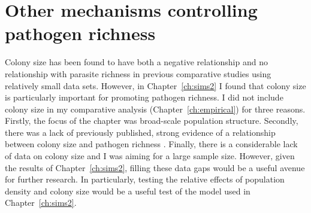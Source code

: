 \section{Other mechanisms controlling pathogen richness}

Colony size has been found to have both a negative relationship \cite{gay2014parasite} and no relationship \cite{turmelle2009correlates} with parasite richness in previous comparative studies using relatively small data sets.
However, in Chapter~\ref{ch:sims2} I found that colony size is particularly important for promoting pathogen richness.
I did not include colony size in my comparative analysis (Chapter~\ref{ch:empirical}) for three reasons.
Firstly, the focus of the chapter was broad-scale population structure.
Secondly, there was a lack of previously published, strong evidence of a relationship between colony size and pathogen richness \cite{turmelle2009correlates}.
Finally, there is a considerable lack of data on colony size and I was aiming for a large sample size.
However, given the results of Chapter~\ref{ch:sims2}, filling these data gaps would be a useful avenue for further research.
In particularly, testing the relative effects of population density and colony size would be a useful test of the model used in Chapter~\ref{ch:sims2}.


